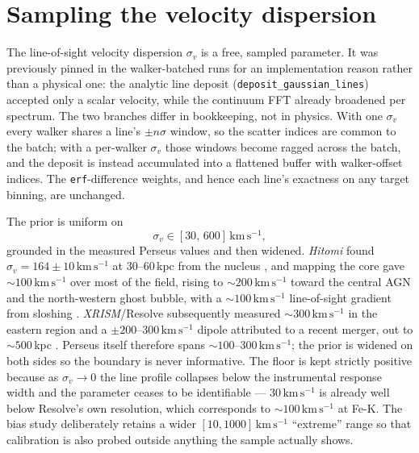 \documentclass[11pt,a4paper]{article}
\newcommand{\kms}{\,\mathrm{km\,s^{-1}}}
\newcommand{\code}[1]{\texttt{#1}}
\begin{document}
\section{Sampling the velocity dispersion}\label{sec:sigmav}
The line-of-sight velocity dispersion $\sigma_v$ is a free, sampled parameter.
It was previously pinned in the walker-batched runs for an implementation
reason rather than a physical one: the analytic line deposit
(\code{deposit\_gaussian\_lines}) accepted only a scalar velocity, while the
continuum FFT already broadened per spectrum. The two branches differ in
bookkeeping, not in physics. With one $\sigma_v$ every walker shares a line's
$\pm n\sigma$ window, so the scatter indices are common to the batch; with a
per-walker $\sigma_v$ those windows become ragged across the batch, and the
deposit is instead accumulated into a flattened buffer with walker-offset
indices. The \code{erf}-difference weights, and hence each line's exactness on
any target binning, are unchanged.

The prior is uniform on
\begin{equation}
\sigma_v \in [30,\,600]\kms ,
\end{equation}
grounded in the measured Perseus values and then widened. \emph{Hitomi} found
$\sigma_v = 164\pm10\kms$ at $30$--$60\,$kpc from the nucleus
\citep{hitomi2016}, and mapping the core gave ${\sim}100\kms$ over most of the
field, rising to ${\sim}200\kms$ toward the central AGN and the north-western
ghost bubble, with a ${\sim}100\kms$ line-of-sight gradient from sloshing
\citep{hitomi2018}. \emph{XRISM}/Resolve subsequently measured ${\sim}300\kms$
in the eastern region and a $\pm200$--$300\kms$ dipole attributed to a recent
merger, out to ${\sim}500\,$kpc \citep{xrism_perseus_kinematics}. Perseus itself
therefore spans ${\sim}100$--$300\kms$; the prior is widened on both sides so
the boundary is never informative. The floor is kept strictly positive because
as $\sigma_v\to0$ the line profile collapses below the instrumental response
width and the parameter ceases to be identifiable --- $30\kms$ is already well
below Resolve's own resolution, which corresponds to ${\sim}100\kms$ at Fe-K.
The bias study deliberately retains a wider $[10,1000]\kms$ ``extreme'' range so
that calibration is also probed outside anything the sample actually shows.
\end{document}
